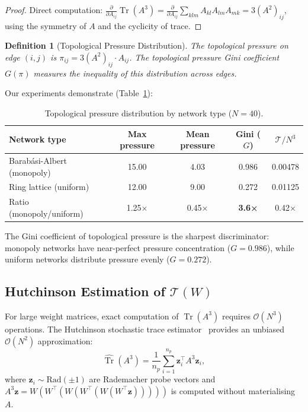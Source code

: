 \documentclass[11pt,a4paper]{article}
\newtheorem{definition}{Definition}
\begin{document}
\begin{proof}
Direct computation: $\frac{\partial}{\partial A_{ij}}
\operatorname{Tr}(A^3) = \frac{\partial}{\partial A_{ij}}
\sum_{klm} A_{kl}A_{lm}A_{mk} = 3(A^2)_{ij}$,
using the symmetry of $A$ and the cyclicity of trace.
\end{proof}

\begin{definition}[Topological Pressure Distribution]
The \emph{topological pressure} on edge $(i,j)$ is $\pi_{ij} = 3(A^2)_{ij} \cdot A_{ij}$.
The \emph{topological pressure Gini coefficient} $G(\pi)$ measures
the inequality of this distribution across edges.
\end{definition}

Our experiments demonstrate (Table~\ref{tab:pressure}):

\begin{table}[ht]
\centering
\caption{Topological pressure distribution by network type ($N=40$).}
\label{tab:pressure}
\begin{tabular}{lcccc}
\toprule
Network type & Max pressure & Mean pressure & Gini ($G$) & $\mathcal{T}/N^3$ \\
\midrule
Barabási-Albert (monopoly) & 15.00 & 4.03 & 0.986 & 0.00478 \\
Ring lattice (uniform)     & 12.00 & 9.00 & 0.272 & 0.01125 \\
\midrule
Ratio (monopoly/uniform)   & 1.25× & 0.45× & \textbf{3.6×} & 0.42× \\
\bottomrule
\end{tabular}
\end{table}

The Gini coefficient of topological pressure is the sharpest
discriminator: monopoly networks have near-perfect pressure
concentration ($G = 0.986$), while uniform networks distribute
pressure evenly ($G = 0.272$).

\subsection{Hutchinson Estimation of $\mathcal{T}(W)$}

For large weight matrices, exact computation of $\operatorname{Tr}(A^3)$
requires $\mathcal{O}(N^3)$ operations. The Hutchinson stochastic trace
estimator~\cite{hutchinson1990} provides an unbiased $\mathcal{O}(N^2)$
approximation:
\begin{equation}
\widehat{\operatorname{Tr}}(A^3) = \frac{1}{n_p} \sum_{i=1}^{n_p}
\mathbf{z}_i^\top A^3 \mathbf{z}_i,
\label{eq:hutchinson}
\end{equation}
where $\mathbf{z}_i \sim \text{Rad}(\pm 1)$ are Rademacher probe vectors
and $A^3 \mathbf{z} = W(W^\top (W(W^\top (W(W^\top \mathbf{z})))))$
is computed without materialising $A$.
\end{document}
